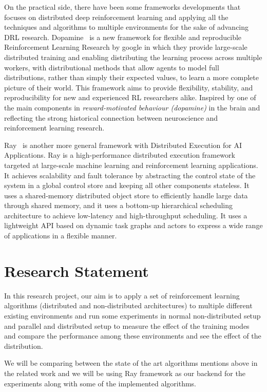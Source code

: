 On the practical side, there have been some frameworks developments that focuses on distributed deep reinforcement learning and applying all the techniques and algorithms to multiple environments for the sake of advancing DRL research. Dopamine~\parencite{castro2018dopamine} is a new framework for flexible and reproducible Reinforcement Learning Research by google in which they provide large-scale distributed training and enabling distributing the learning process across multiple workers, with distributional methods that allow agents to model full distributions, rather than simply their expected values, to learn a more complete picture of their world. This framework aims to provide flexibility, stability, and reproducibility for new and experienced RL researchers alike. Inspired by one of the main components in \textit{reward-motivated behaviour (dopamine)} in the brain and reflecting the strong historical connection between neuroscience and reinforcement learning research.

Ray~\parencite{moritz2018ray} is another more general framework with Distributed Execution for AI Applications. Ray is a high-performance distributed execution framework targeted at large-scale machine learning and reinforcement learning applications. It achieves scalability and fault tolerance by abstracting the control state of the system in a global control store and keeping all other components stateless. It uses a shared-memory distributed object store to efficiently handle large data through shared memory, and it uses a bottom-up hierarchical scheduling architecture to achieve low-latency and high-throughput scheduling. It uses a lightweight API based on dynamic task graphs and actors to express a wide range of applications in a flexible manner.


\section{Research Statement}
In this research project, our aim is to apply a set of reinforcement learning algorithms (distributed and non-distributed architectures) to multiple different existing environments and run some experiments in normal non-distributed setup and parallel and distributed setup to measure the effect of the training modes and compare the performance among these environments and see the effect of the distribution. 

We will be comparing between the state of the art algorithms mentions above in the related work and we will be using Ray framework as our backend for the experiments along with some of the implemented algorithms. 

